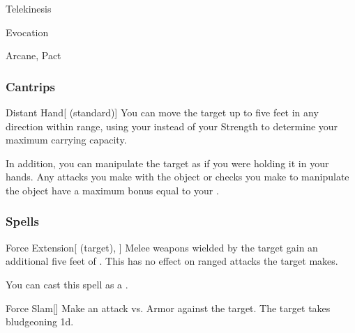 \newpage
\begin{spellsection}{Telekinesis}

\begin{spellheader}
\end{spellheader}


 Evocation

 Arcane, Pact

\subsubsection{Cantrips}


\begin{freeability}{Distant Hand}[ (standard)]
You can move the target up to five feet in any direction within range, using your  instead of your Strength to determine your maximum carrying capacity.

In addition, you can manipulate the target as if you were holding it in your hands.
Any attacks you make with the object or checks you make to manipulate the object have a maximum bonus equal to your .
\end{freeability}

\end{spellsection}


\subsubsection{Spells}


\lowercase{\hypertarget{spell:Force Extension}{}}\label{spell:Force Extension}
\begin{attuneability}[\nth{1}]{\hypertarget{spell:Force Extension}{Force Extension}}[ (target), ]
Melee weapons wielded by the target gain an additional five feet of .
This has no effect on ranged attacks the target makes.

You can cast this spell as a .
\end{attuneability}
\vspace{0.25em}



\lowercase{\hypertarget{spell:Force Slam}{}}\label{spell:Force Slam}
\begin{freeability}[\nth{1}]{\hypertarget{spell:Force Slam}{Force Slam}}[]
Make an attack vs. Armor against the target.
\hit The target takes bludgeoning  \plus1d.
\end{freeability}
\vspace{0.25em}



